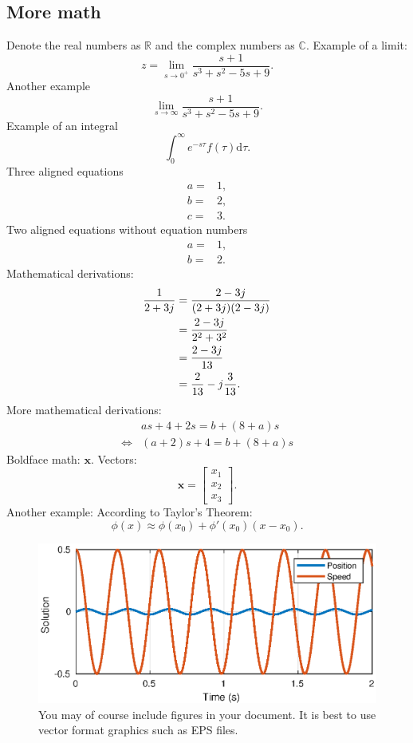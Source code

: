 \documentclass[a4paper,10pt,reqno]{amsart}
\numberwithin{equation}{section}
\newcommand{\R}{\mathbb{R}}
\newcommand{\C}{\mathbb{C}}
\newcommand{\dd}{\mathrm{d}}
\begin{document}
\subsection{More math} Denote the real numbers as $\R$ and the complex numbers
as $\C$. Example of a limit:
\begin{equation}
    z = \lim_{s\to0^+}\frac{s+1}{s^3+s^2-5s+9}.
\end{equation}
Another example
\begin{equation}
    \lim_{s\to\infty} \frac{s+1}{s^3+s^2-5s+9}.
\end{equation}
Example of an integral
\begin{equation}
    \int_0^\infty e^{-s\tau}f(\tau)\dd\tau.
\end{equation}
Three aligned equations
\begin{align}
    a =& 1,
    \\
    b =& 2,
    \\
    c =& 3.
\end{align}
Two aligned equations without equation numbers
\begin{align*}
    a =& 1,
    \\
    b =& 2.
\end{align*}
Mathematical derivations:
\begin{align}
    \frac{1}{2+3j} {}={}& \frac{2-3j}{(2+3j)(2-3j)}
    \notag\\
    {}={}& \frac{2-3j}{2^2 + 3^2}
    \notag\\
    {}={}& \frac{2-3j}{13}
    \notag\\
    {}={}&\frac{2}{13} - j\frac{3}{13}.
\end{align}
More mathematical derivations:
\begin{align*}
 & as + 4 + 2s = b + (8+a)s
\\
 \Leftrightarrow{}& (a+2)s + 4 = b + (8+a)s
\end{align*}
Boldface math: $\bm{x}$. Vectors:
\begin{equation}
\bm{x} = 
    \begin{bmatrix}
    x_1
    \\
    x_2
    \\
    x_3
    \end{bmatrix}.
\end{equation}
Another example: According to Taylor's Theorem:
\begin{equation}
    \phi(x) \approx \phi(x_0) + \phi'(x_0)(x-x_0).
\end{equation}


\begin{figure}
 \centering
 \includegraphics[width=0.6\linewidth]{figures/ode45_1.eps}
 \caption{You may of course include figures in your document. It is best to use vector format graphics such as EPS files.}
\end{figure}
\end{document}
